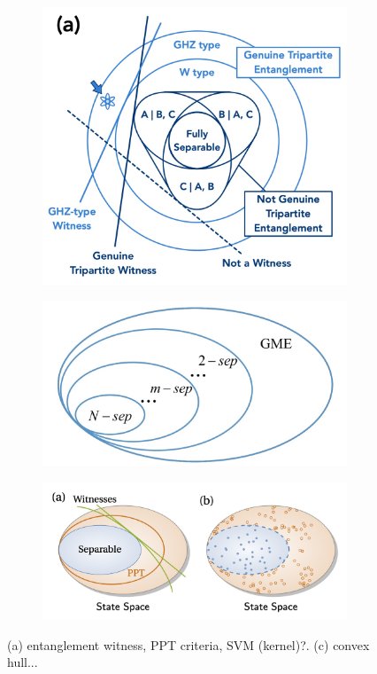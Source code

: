\documentclass[
10pt,
aps,
pra,
linenumbers,
floatfix,
]{revtex4-2}
\theoremstyle{plain}
\theoremstyle{definition}
\begin{document}
\begin{figure}[!ht]
	\centering
	\begin{subfigure}{0.3\textwidth}
		\centering
		\includegraphics[width=.9\linewidth]{gme.jpg}
	\end{subfigure}
	\begin{subfigure}{0.3\textwidth}
		\centering
		\includegraphics[width=.8\linewidth]{sep.jpg}
	\end{subfigure}
	\begin{subfigure}{0.3\textwidth}
		\centering
		\includegraphics[width=.9\linewidth]{ppt.jpg}
	\end{subfigure}
	\caption{(a) entanglement witness, PPT criteria, SVM (kernel)?. (c) convex hull... }
	\label{fig:entangle}
\end{figure}
\end{document}
